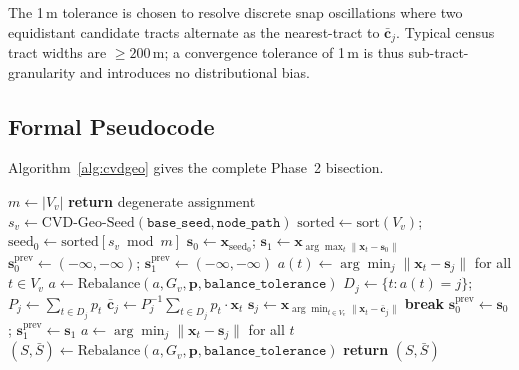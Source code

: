 The 1\,m tolerance is chosen to resolve discrete snap oscillations where two
equidistant candidate tracts alternate as the nearest-tract to
$\bar{\mathbf{c}}_j$.
Typical census tract widths are $\ge 200$\,m; a convergence tolerance of
1\,m is thus sub-tract-granularity and introduces no distributional bias.

\subsection{Formal Pseudocode}

Algorithm~\ref{alg:cvdgeo} gives the complete Phase~2 \cvdgeo{} bisection.

\begin{algorithm}[t]
\caption{\cvdgeo{}-\textsc{Bisect}($G_v$, $\mathbf{x}$, $\mathbf{p}$, $k_L$, $k_R$,
  $\mathtt{base\_seed}$, $\mathtt{node\_path}$, $\mathtt{cvd\_iters}$,
  $\mathtt{balance\_tolerance}$)}
\label{alg:cvdgeo}
\begin{algorithmic}[1]
\State $m \gets |V_v|$
  \textbf{return} degenerate assignment
\EndIf
\State $s_v \gets \mathrm{CVD\text{-}Geo\text{-}Seed}(\mathtt{base\_seed}, \mathtt{node\_path})$
\State $\mathrm{sorted} \gets \mathrm{sort}(V_v)$;
       $\mathrm{seed}_0 \gets \mathrm{sorted}[s_v \bmod m]$
\State $\mathbf{s}_0 \gets \mathbf{x}_{\mathrm{seed}_0}$;
       $\mathbf{s}_1 \gets \mathbf{x}_{\arg\max_t \|\mathbf{x}_t - \mathbf{s}_0\|}$
\State $\mathbf{s}_0^{\mathrm{prev}} \gets (-\infty, -\infty)$;
       $\mathbf{s}_1^{\mathrm{prev}} \gets (-\infty, -\infty)$
  \State $a(t) \gets \arg\min_{j} \|\mathbf{x}_t - \mathbf{s}_j\|$ for all $t \in V_v$
  \State $a \gets \mathrm{Rebalance}(a, G_v, \mathbf{p}, \mathtt{balance\_tolerance})$
    \State $D_j \gets \{t : a(t) = j\}$;
           $P_j \gets \sum_{t \in D_j} p_t$
    \State $\bar{\mathbf{c}}_j \gets P_j^{-1}\sum_{t \in D_j} p_t \cdot \mathbf{x}_t$
    \State $\mathbf{s}_j \gets \mathbf{x}_{\arg\min_{t \in V_v} \|\mathbf{x}_t - \bar{\mathbf{c}}_j\|}$
  \EndFor
    \textbf{break}
  \EndIf
  \State $\mathbf{s}_0^{\mathrm{prev}} \gets \mathbf{s}_0$;
         $\mathbf{s}_1^{\mathrm{prev}} \gets \mathbf{s}_1$
\EndFor
\State $a \gets \arg\min_j \|\mathbf{x}_t - \mathbf{s}_j\|$ for all $t$
\State $(S, \bar{S}) \gets \mathrm{Rebalance}(a, G_v, \mathbf{p}, \mathtt{balance\_tolerance})$
\State \textbf{return} $(S, \bar{S})$
\end{algorithmic}
\end{algorithm}

